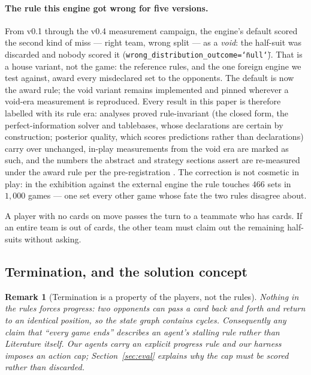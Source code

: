 \documentclass[11pt,letterpaper]{article}
\newtheorem{remark}{Remark}
\begin{document}
\paragraph{The rule this engine got wrong for five versions.} From v0.1
through the v0.4 measurement campaign, the engine's default scored the
second kind of miss --- right team, wrong split --- as a \emph{void}: the
half-suit was discarded and nobody scored it
(\texttt{wrong\_distribution\_outcome=\char`\"null\char`\"}). That is a house
variant, not the game: the reference rules, and the one foreign engine we
test against, award every misdeclared set to the opponents. The default is
now the award rule; the void variant remains implemented and pinned wherever
a void-era measurement is reproduced. Every result in this paper is
therefore labelled with its rule era: analyses proved rule-invariant
(the closed form, the perfect-information solver and tablebases, whose
declarations are certain by construction; posterior quality, which scores
predictions rather than declarations) carry over unchanged, in-play
measurements from the void era are marked as such, and the numbers the
abstract and strategy sections assert are re-measured under the award rule
per the pre-registration . The
correction is not cosmetic in play: in the exhibition against the external
engine the rule touches $466$ sets in $1{,}000$ games --- one set
every other game whose fate the two rules disagree about.

A player with no cards on move passes the turn to a teammate who has cards. If
an entire team is out of cards, the other team must claim out the remaining
half-suits without asking.

\subsection{Termination, and the solution concept}

\begin{remark}[Termination is a property of the players, not the rules]
Nothing in the rules forces progress: two opponents can pass a card back and
forth and return to an identical position, so the state graph contains cycles.
Consequently any claim that ``every game ends'' describes an agent's stalling
rule rather than Literature itself. Our agents carry an explicit progress rule
and our harness imposes an action cap; Section~\ref{sec:eval} explains why the
cap must be \emph{scored} rather than discarded.
\end{remark}
\end{document}
